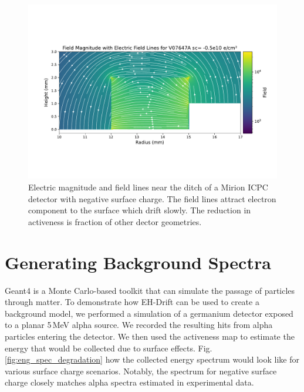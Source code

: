 \begin{figure}%
\includegraphics[trim={0cm 3cm 0cm 4.69cm},clip,width=0.99\linewidth]{ch5/figs/elect_field_lines_surface_V07647A_sc_-0.5.pdf}
\caption{Electric magnitude and field lines near the ditch of a Mirion ICPC detector with negative surface charge. The field lines attract electron component to the surface which drift slowly. The reduction in activeness is fraction of other dector geometries.}
\label{ch5_fig_elect_field_lines_surface_V07647A}
\end{figure}


\section{\label{res:3} Generating Background Spectra}

Geant4 is a Monte Carlo-based toolkit that can simulate the passage of particles through matter. To demonstrate how EH-Drift can be used to create a background model, we performed a {\geant} simulation of a germanium detector exposed to a planar 5\,MeV alpha source. We recorded the resulting hits from alpha particles entering the detector. We then used the activeness map to estimate the energy that would be collected due to surface effects. Fig. \ref{fig:eng_spec_degradation} how the collected energy spectrum would look like for various surface charge scenarios. Notably, the spectrum for negative surface charge closely matches alpha spectra estimated in experimental data.


